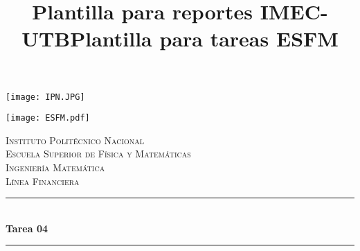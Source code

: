\documentclass[10pt]{article}\usepackage[]{graphicx}\usepackage[]{color}
\title{Plantilla para reportes IMEC-UTB}
\title{Plantilla para tareas ESFM}
\begin{document}
\begin{center}																		%
\newcommand{\HRule}{\rule{\linewidth}{0.5mm}}									%
\begin{minipage}{0.48\textwidth} \begin{flushleft}
\texttt{[image: IPN.JPG]}
\end{flushleft}\end{minipage}
\begin{minipage}{0.48\textwidth} \begin{flushright}
\texttt{[image: ESFM.pdf]}
\end{flushright}\end{minipage}

\vspace*{1.0cm}								%
\textsc{\huge Instituto Politécnico Nacional \\ \vspace{5px} Escuela Superior de Física y Matemáticas}\\[1.5cm]	

\textsc{\LARGE  Ingeniería Matemática \\ \vspace{5px} Línea Financiera }\\[1.5cm]													%


 			\vspace*{1cm}																		%
\HRule \\[0.4cm]																	%
{ \huge \bfseries Tarea 04}\\[0.4cm]	%
\HRule \\[1 cm]																	%
\begin{minipage}{0.46\textwidth}													%
\begin{flushleft} \large															%


\end{flushleft}
\end{minipage}
\end{center}
\end{document}
